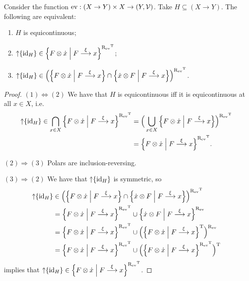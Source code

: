 \begin{lemma}
Consider the function $\evalMap: (X\to Y)\times X \to \sSet{Y,\mathcal{V}}$. Take $H\subseteq (X\to Y)$. The following are equivalent:
\begin{enumerate}
\item $H$ is equicontinuous;
\item $\upset\{\id_H\} \in \setbuilder{F\otimes \pfilter{x}}{F\overset{\xi}{\longrightarrow}x}^{\uRelEv^\transp}$;
\item $\upset\{\id_H\} \in \Big(\setbuilder{F\otimes \pfilter{x}}{F\overset{\xi}{\longrightarrow}x} \cap \setbuilder{\pfilter{x}\otimes F}{F\overset{\xi}{\longrightarrow}x}\Big)^{\uRelEv^\transp}$.
\end{enumerate}
\end{lemma}
\begin{proof}
$(1) \Leftrightarrow (2)$ We have that $H$ is equicontinuous iff it is equicontinuous at all $x\in X$, i.e.\
\begin{align*}
\upset\{\id_H\}\in \bigcap_{x\in X}\setbuilder{F\otimes \pfilter{x}}{F\overset{\xi}{\longrightarrow}x}^{\uRelEv^\transp} &= \Big(\bigcup_{x\in X}\setbuilder{F\otimes \pfilter{x}}{F\overset{\xi}{\longrightarrow}x}\Big)^{\uRelEv^\transp} \\
&= \setbuilder{F\otimes \pfilter{x}}{F\overset{\xi}{\longrightarrow}x}^{\uRelEv^\transp}.
\end{align*}

$(2) \Rightarrow (3)$ Polars are inclusion-reversing.

$(3) \Rightarrow (2)$ We have that $\operatorname{\uparrow}\{\operatorname{id}_H\}$ is symmetric, so
\begin{align*}
\upset\{\id_H\} &\in \Big(\setbuilder{F\otimes \pfilter{x}}{F\overset{\xi}{\longrightarrow}x} \cap \setbuilder{\pfilter{x}\otimes F}{F\overset{\xi}{\longrightarrow}x}\Big)^{\uRelEv^\transp} \\
&= \setbuilder{F\otimes \pfilter{x}}{F\overset{\xi}{\longrightarrow}x}^{\uRelEv^\transp} \cup \setbuilder{\pfilter{x}\otimes F}{F\overset{\xi}{\longrightarrow}x}^{\uRelEv} \\
&= \setbuilder{F\otimes \pfilter{x}}{F\overset{\xi}{\longrightarrow}x}^{\uRelEv^\transp} \cup \Big(\setbuilder{F\otimes\pfilter{x}}{F\overset{\xi}{\longrightarrow}x}^{\transp}\Big)^{\uRelEv} \\
&= \setbuilder{F\otimes \pfilter{x}}{F\overset{\xi}{\longrightarrow}x}^{\uRelEv^\transp} \cup \Big(\setbuilder{F\otimes\pfilter{x}}{F\overset{\xi}{\longrightarrow}x}^{\uRelEv^\transp}\Big)^{\transp}
\end{align*}
implies that $\upset\{\id_H\} \in \setbuilder{F\otimes \pfilter{x}}{F\overset{\xi}{\longrightarrow}x}^{\uRelEv^\transp}$.
\end{proof}

